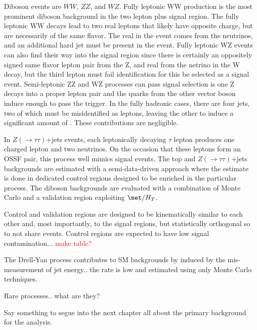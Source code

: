 Diboson events are $WW$, $ZZ$, and $WZ$.  Fully leptonic WW production is the most prominent diboson background in the two lepton plus \met signal region.  The fully leptonic WW decays lead to two real leptons that likely have opposite charge, but are necessarily of the same flavor.  The real \met in the event comes from the neutrinos, and an additional hard jet must be present in the event.  Fully leptonic WZ events can also find their way into the signal region since there is certainly an oppositely signed same flavor lepton pair from the Z, and real \met from the netrino in the W decay, but the third lepton must fail identification for this be selected as a signal event.  Semi-leptonic ZZ and WZ processes can pass signal selection is one Z decays into a proper lepton pair and the quarks from the other vector boson induce enough \met to pass the \met trigger.  In the fully hadronic cases, there are four jets, two of which must be misidentified as leptons, leaving the other to induce a significant amount of \met.  These contributions are negligible.    

In $Z(\rightarrow\tau\tau)$+jets events, each leptonically decaying $\tau$ lepton produces one charged lepton and two neutrinos.  On the occasion that these leptons form an OSSF pair, this process well mimics signal events.  The top and $Z(\rightarrow\tau\tau)$+jets backgrounds are estimated with a semi-data-driven approach where the estimate is done in dedicated control regions designed to be enriched in the particular process.  The diboson backgrounds are evaluated with a combination of Monte Carlo and a validation region exploiting $\met/H_T$.

Control and validation regions are designed to be kinematically similar to each other and, most importantly, to the signal regions, but statistically orthogonal so to not share events.  Control regions are expected to have low signal contamination...  \textcolor{red}{make table?}

The Drell-Yan process contributes to SM backgrounds by \met induced by the mis-measurement of jet energy.. the rate is low and estimated using only Monte Carlo techniques.

Rare processes..  what are they?

Say something to segue into the next chapter all about the primary background for the analysis.

